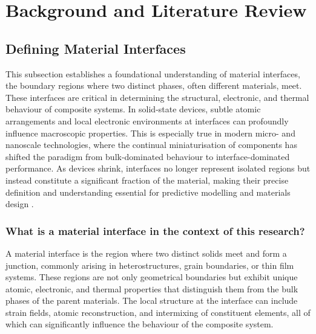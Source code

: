 \chapter{Background and Literature Review} \label{chapter:background}

\section{Defining Material Interfaces} \label{section:material_interfaces}

This subsection establishes a foundational understanding of material interfaces, the boundary regions where two distinct phases, often different materials, meet. These interfaces are critical in determining the structural, electronic, and thermal behaviour of composite systems. In solid-state devices, subtle atomic arrangements and local electronic environments at interfaces can profoundly influence macroscopic properties. This is especially true in modern micro- and nanoscale technologies, where the continual miniaturisation of components has shifted the paradigm from bulk-dominated behaviour to interface-dominated performance. As devices shrink, interfaces no longer represent isolated regions but instead constitute a significant fraction of the material, making their precise definition and understanding essential for predictive modelling and materials design .

\subsection{What is a material interface in the context of this research?}

A material interface is the region where two distinct solids meet and form a junction, commonly arising in heterostructures, grain boundaries, or thin film systems. These regions are not only geometrical boundaries but exhibit unique atomic, electronic, and thermal properties that distinguish them from the bulk phases of the parent materials. The local structure at the interface can include strain fields, atomic reconstruction, and intermixing of constituent elements, all of which can significantly influence the behaviour of the composite system.


